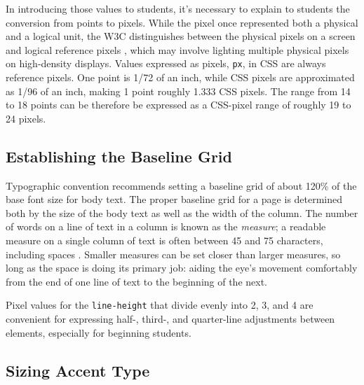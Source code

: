 \documentclass[sigconf,sigplan,review,anonymous]{acmart}
\begin{document}
In introducing those values to students, it’s necessary to explain to students the conversion from points to pixels. While the pixel once represented both a physical and a logical unit, the W3C distinguishes between the physical pixels on a screen and logical reference pixels \cite[§~5.2]{w3c:values}, which may involve lighting multiple physical pixels on high-density displays. Values expressed as pixels, \verb|px|, in CSS are always reference pixels. One point is 1/72 of an inch, while CSS pixels are approximated as 1/96 of an inch, making 1 point roughly 1.333 CSS pixels. The range from 14 to 18 points can be therefore be expressed as a CSS-pixel range of roughly 19 to 24 pixels.

\subsection{Establishing the Baseline Grid}

Typographic convention recommends setting a baseline grid of about 120\% of the base font size for body text. The proper baseline grid for a page is determined both by the size of the body text as well as the width of the column. The number of words on a line of text in a column is known as the {\itshape measure}; a readable measure on a single column of text is often between 45 and 75 characters, including spaces \cite[pp. 26–27]{rb:style}. Smaller measures can be set closer than larger measures, so long as the space is doing its primary job: aiding the eye's movement comfortably from the end of one line of text to the beginning of the next.

Pixel values for the \verb|line-height| that divide evenly into 2, 3, and 4 are convenient for  expressing half-, third-, and quarter-line adjustments between elements, especially for beginning students.

\subsection{Sizing Accent Type}
\end{document}
